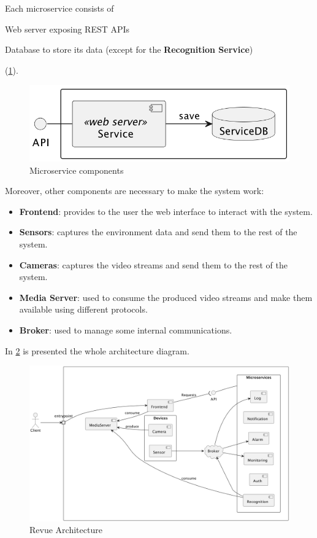 \documentclass{scrartcl}
\begin{document}
    Each microservice consists of
    \begin{enumerate*}
        \item Web server exposing REST APIs
        \item Database to store its data (except for the \textbf{Recognition Service})
    \end{enumerate*}
    (\cref{fig:microservice}).

    \begin{figure}
        \centering
        \includegraphics[scale=0.6]{img/microservice}
        \caption{Microservice components}
        \label{fig:microservice}
    \end{figure}

    Moreover, other components are necessary to make the system work:

    \begin{itemize}
        \item \textbf{Frontend}: provides to the user the web interface to interact with the system.
        \item \textbf{Sensors}: captures the environment data and send them to the rest of the system.
        \item \textbf{Cameras}: captures the video streams and send them to the rest of the system.
        \item \textbf{Media Server}: used to consume the produced video streams and make them available using different protocols.
        \item \textbf{Broker}: used to manage some internal communications.
    \end{itemize}

    In \cref{fig:architecture} is presented the whole architecture diagram.

    \begin{figure}
        \centering
        \includegraphics[scale=0.51]{img/architecture}
        \caption{Revue Architecture}
        \label{fig:architecture}
    \end{figure}
\end{document}
